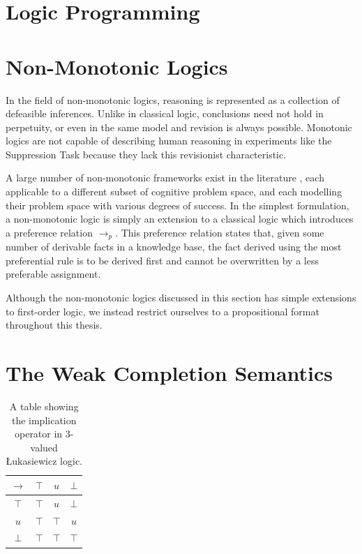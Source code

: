 \documentclass[
11pt, %
english, %
singlespacing, %
headsepline, %
]{MastersDoctoralThesis} %
\begin{document}
\section{Logic Programming}

\section{Non-Monotonic Logics}
In the field of non-monotonic logics, reasoning is represented as a collection of defeasible inferences. Unlike in classical logic, conclusions need not hold in perpetuity, or even in the same model and revision is always possible. Monotonic logics are not capable of describing human reasoning in experiments like the Suppression Task \citep{dietz2012computational} because they lack this revisionist characteristic.

A large number of non-monotonic frameworks exist in the literature \citep{mcdermott1980non}, each applicable to a different subset of cognitive problem space, and each modelling their problem space with various degrees of success. In the simplest formulation, a non-monotonic logic is simply an extension to a classical logic which introduces a preference relation $\rightarrow_p$. This preference relation states that, given some number of derivable facts in a knowledge base, the fact derived using the most preferential rule is to be derived first and cannot be overwritten by a less preferable assignment.  

Although the non-monotonic logics discussed in this section has simple extensions to first-order logic, we instead restrict ourselves to a propositional format throughout this thesis.
\section{The Weak Completion Semantics}
\begin{table}
\begin{center}
\begin{tabular}{ c | c c c }
  $\rightarrow$& $\top$ & $u$ & $\bot$ \\ \hline
 $\top$ & $\top$ & $u$ & $\bot$ \\  
 $u$ & $\top$ & $\top$ & $u$\\  
 $\bot$ & $\top$ & $\top$ & $\top$
\end{tabular}
\caption{A table showing the implication operator in 3-valued \L ukasiewicz logic.}
\label{tbl:luk}
\end{center}
\end{table}
\end{document}
